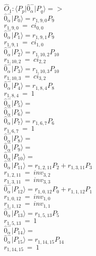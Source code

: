 \documentclass[14pt]{article}
\begin{document}
    $\hat{O}_{1}:  \langle{P_p}\vert \hat{0}_{\alpha}^{-} \vert{P_q}\rangle => $ \\ 
    $ \hat{0}_{\alpha}^{-} \vert{P_{0}}\rangle = {r}_{1,9,0}P_{9} $ \\ 
    ${r}_{1,9,0}\ =\ {ci}_{0,0} $ \\ 
    $ \hat{0}_{\alpha}^{-} \vert{P_{1}}\rangle = {r}_{1,9,1}P_{9} $ \\ 
    ${r}_{1,9,1}\ =\ {ci}_{1,0} $ \\ 
    $ \hat{0}_{\alpha}^{-} \vert{P_{2}}\rangle = {r}_{1,10,2}P_{10} $ \\ 
    ${r}_{1,10,2}\ =\ {ci}_{2,2} $ \\ 
    $ \hat{0}_{\alpha}^{-} \vert{P_{3}}\rangle = {r}_{1,10,3}P_{10} $ \\ 
    ${r}_{1,10,3}\ =\ {ci}_{3,2} $ \\ 
    $ \hat{0}_{\alpha}^{-} \vert{P_{4}}\rangle = {r}_{1,8,4}P_{8} $ \\ 
    ${r}_{1,8,4}\ =\ 1 $ \\ 
    $ \hat{0}_{\alpha}^{-} \vert{P_{5}}\rangle =  $ \\ 
    $ \hat{0}_{\alpha}^{-} \vert{P_{6}}\rangle =  $ \\ 
    $ \hat{0}_{\alpha}^{-} \vert{P_{7}}\rangle = {r}_{1,6,7}P_{6} $ \\ 
    ${r}_{1,6,7}\ =\ 1 $ \\ 
    $ \hat{0}_{\alpha}^{-} \vert{P_{8}}\rangle =  $ \\ 
    $ \hat{0}_{\alpha}^{-} \vert{P_{9}}\rangle =  $ \\ 
    $ \hat{0}_{\alpha}^{-} \vert{P_{10}}\rangle =  $ \\ 
    $ \hat{0}_{\alpha}^{-} \vert{P_{11}}\rangle = {r}_{1,2,11}P_{2}+{r}_{1,3,11}P_{3} $ \\ 
    ${r}_{1,2,11}\ =\ {inv}_{3,2} $ \\ 
    ${r}_{1,3,11}\ =\ {inv}_{3,3} $ \\ 
    $ \hat{0}_{\alpha}^{-} \vert{P_{12}}\rangle = {r}_{1,0,12}P_{0}+{r}_{1,1,12}P_{1} $ \\ 
    ${r}_{1,0,12}\ =\ {inv}_{1,0} $ \\ 
    ${r}_{1,1,12}\ =\ {inv}_{1,1} $ \\ 
    $ \hat{0}_{\alpha}^{-} \vert{P_{13}}\rangle = {r}_{1,5,13}P_{5} $ \\ 
    ${r}_{1,5,13}\ =\ 1 $ \\ 
    $ \hat{0}_{\alpha}^{-} \vert{P_{14}}\rangle =  $ \\ 
    $ \hat{0}_{\alpha}^{-} \vert{P_{15}}\rangle = {r}_{1,14,15}P_{14} $ \\ 
    ${r}_{1,14,15}\ =\ 1 $ \\ 
    
\end{document}
